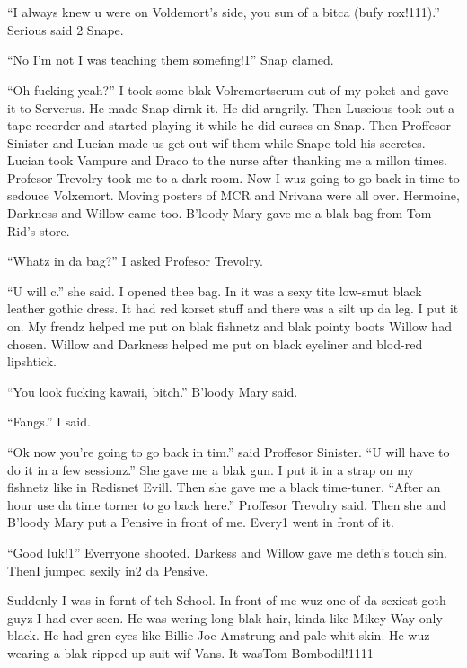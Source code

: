 \section{\chaptername~\thesection}



\enquote{I always knew u were on Voldemort's side, you sun of a bitca (bufy rox!111).} Serious said 2 Snape.

\enquote{No I'm not I was teaching them somefing!1} Snap clamed.

\enquote{Oh fucking yeah?} I took some blak Volremortserum out of my poket and gave it to Serverus. He made Snap dirnk it. He did arngrily. Then Luscious took out a tape recorder and started playing it while he did curses on Snap. Then Proffesor Sinister and Lucian made us get out wif them while Snape told his secretes. Lucian took Vampure and Draco to the nurse after thanking me a millon times. Profesor Trevolry took me to a dark room. Now I wuz going to go back in time to sedouce Volxemort. Moving posters of MCR and Nrivana were all over. Hermoine, Darkness and Willow came too. B'loody Mary gave me a blak bag from Tom Rid's store.

\enquote{Whatz in da bag?} I asked Profesor Trevolry.

\enquote{U will c.} she said. I opened thee bag. In it was a sexy tite low-smut black leather gothic dress. It had red korset stuff and there was a silt up da leg. I put it on. My frendz helped me put on blak fishnetz and blak pointy boots Willow had chosen. Willow and Darkness helped me put on black eyeliner and blod-red lipshtick.

\enquote{You look fucking kawaii, bitch.} B'loody Mary said.

\enquote{Fangs.} I said.

\enquote{Ok now you're going to go back in tim.} said Proffesor Sinister. \enquote{U will have to do it in a few sessionz.} She gave me a blak gun. I put it in a strap on my fishnetz like in Redisnet Evill. Then she gave me a black time-tuner. \enquote{After an hour use da time torner to go back here.} Proffesor Trevolry said. Then she and B'loody Mary put a Pensive in front of me. Every1 went in front of it.

\enquote{Good luk!1} Everryone shooted. Darkess and Willow gave me deth's touch sin. Then\dotfill I jumped sexily in2 da Pensive.

Suddenly I was in fornt of teh School. In front of me wuz one of da sexiest goth guyz I had ever seen. He was wering long blak hair, kinda like Mikey Way only black. He had gren eyes like Billie Joe Amstrung and pale whit skin. He wuz wearing a blak ripped up suit wif Vans. It was\dotfill Tom Bombodil!1111
